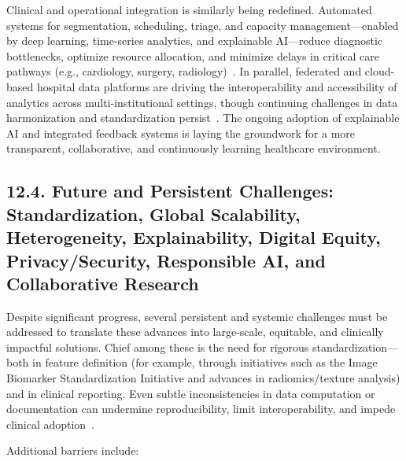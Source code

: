 \documentclass[11pt]{article}
\begin{document}
Clinical and operational integration is similarly being redefined. Automated systems for segmentation, scheduling, triage, and capacity management—enabled by deep learning, time-series analytics, and explainable AI—reduce diagnostic bottlenecks, optimize resource allocation, and minimize delays in critical care pathways (e.g., cardiology, surgery, radiology)~\cite{ref49, ref72, ref73, ref74, ref75, ref76, ref100, ref101}. In parallel, federated and cloud-based hospital data platforms are driving the interoperability and accessibility of analytics across multi-institutional settings, though continuing challenges in data harmonization and standardization persist~\cite{ref88, ref89}. The ongoing adoption of explainable AI and integrated feedback systems is laying the groundwork for a more transparent, collaborative, and continuously learning healthcare environment.

\subsection{12.4. Future and Persistent Challenges: Standardization, Global Scalability, Heterogeneity, Explainability, Digital Equity, Privacy/Security, Responsible AI, and Collaborative Research}

Despite significant progress, several persistent and systemic challenges must be addressed to translate these advances into large-scale, equitable, and clinically impactful solutions. Chief among these is the need for rigorous standardization—both in feature definition (for example, through initiatives such as the Image Biomarker Standardization Initiative and advances in radiomics/texture analysis) and in clinical reporting. Even subtle inconsistencies in data computation or documentation can undermine reproducibility, limit interoperability, and impede clinical adoption~\cite{ref5, ref13, ref16, ref17, ref18, ref19, ref20, ref21, ref22, ref23, ref24, ref25, ref28, ref30, ref31, ref32, ref33, ref34, ref35, ref36, ref37, ref38, ref39, ref40, ref41, ref42, ref43, ref44, ref45, ref46, ref47, ref48, ref49, ref50, ref51, ref52, ref53, ref54, ref55, ref56, ref57, ref58, ref59, ref60, ref61, ref62, ref63, ref64, ref65, ref66, ref67, ref68, ref69, ref70, ref71, ref72, ref73, ref74, ref75, ref76, ref77, ref78, ref79, ref80, ref81, ref82, ref83, ref84, ref85, ref86, ref87, ref88, ref89, ref90, ref91, ref92, ref94, ref95, ref96, ref97, ref98, ref99, ref100, ref101, ref102, ref103, ref104, ref105, ref106, ref107}.

Additional barriers include:
\end{document}
